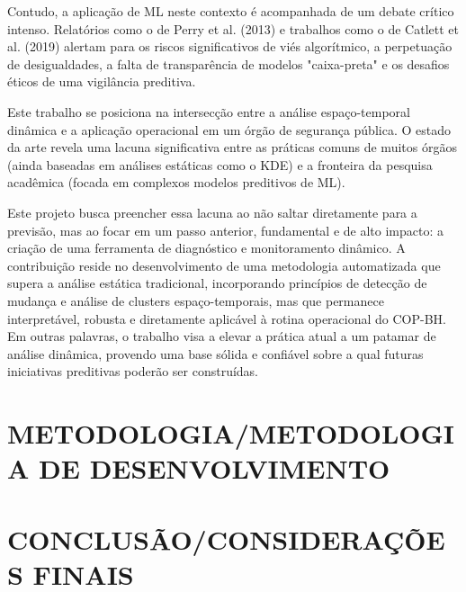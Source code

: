 Contudo, a aplicação de ML neste contexto é acompanhada de um debate crítico intenso. Relatórios como o de Perry et al. (2013) e trabalhos como o de Catlett et al. (2019) alertam para os riscos significativos de viés algorítmico, a perpetuação de desigualdades, a falta de transparência de modelos "caixa-preta" e os desafios éticos de uma vigilância preditiva.

Este trabalho se posiciona na intersecção entre a análise espaço-temporal dinâmica e a aplicação operacional em um órgão de segurança pública. O estado da arte revela uma lacuna significativa entre as práticas comuns de muitos órgãos (ainda baseadas em análises estáticas como o KDE) e a fronteira da pesquisa acadêmica (focada em complexos modelos preditivos de ML).

Este projeto busca preencher essa lacuna ao não saltar diretamente para a previsão, mas ao focar em um passo anterior, fundamental e de alto impacto: a criação de uma ferramenta de diagnóstico e monitoramento dinâmico. A contribuição reside no desenvolvimento de uma metodologia automatizada que supera a análise estática tradicional, incorporando princípios de detecção de mudança e análise de clusters espaço-temporais, mas que permanece interpretável, robusta e diretamente aplicável à rotina operacional do COP-BH. Em outras palavras, o trabalho visa a elevar a prática atual a um patamar de análise dinâmica, provendo uma base sólida e confiável sobre a qual futuras iniciativas preditivas poderão ser construídas.

\section{METODOLOGIA/METODOLOGIA DE DESENVOLVIMENTO} %
\label{sec:metodologia}

\section{CONCLUSÃO/CONSIDERAÇÕES FINAIS} %
\label{sec:conclusao}

